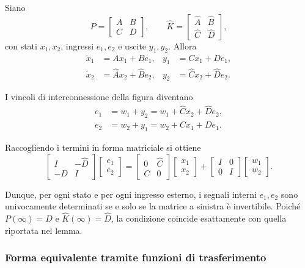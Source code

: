 \documentclass[11pt,a4paper]{article}
\begin{document}
Siano
$$
P = \begin{bmatrix} A & B \\ C & D \end{bmatrix},
\qquad
\hat K = \begin{bmatrix} \hat A & \hat B \\ \hat C & \hat D \end{bmatrix},
$$
con stati $x_1,x_2$, ingressi $e_1,e_2$ e uscite $y_1,y_2$. Allora
\begin{align*}
\dot x_1 &= A x_1 + B e_1, & y_1 &= Cx_1 + De_1, \\
\dot x_2 &= \hat A x_2 + \hat B e_2, & y_2 &= \hat Cx_2 + \hat D e_2.
\end{align*}

I vincoli di interconnessione della figura diventano
\begin{align*}
e_1 &= w_1 + y_2 = w_1 + \hat Cx_2 + \hat D e_2,\\
e_2 &= w_2 + y_1 = w_2 + Cx_1 + D e_1.
\end{align*}

Raccogliendo i termini in forma matriciale si ottiene
$$
\begin{bmatrix}
I & -\hat D \\
-D & I
\end{bmatrix}
\begin{bmatrix}
e_1 \\ e_2
\end{bmatrix}
=
\begin{bmatrix}
0 & \hat C \\
C & 0
\end{bmatrix}
\begin{bmatrix}
x_1 \\ x_2
\end{bmatrix}
+
\begin{bmatrix}
I & 0 \\
0 & I
\end{bmatrix}
\begin{bmatrix}
w_1 \\ w_2
\end{bmatrix}.
$$

Dunque, per ogni stato e per ogni ingresso esterno, i segnali interni $e_1,e_2$ sono univocamente determinati se e solo se la matrice a sinistra è invertibile. Poiché $P(\infty)=D$ e $\hat K(\infty)=\hat D$, la condizione coincide esattamente con quella riportata nel lemma.

\subsubsection{Forma equivalente tramite funzioni di trasferimento}
\end{document}
